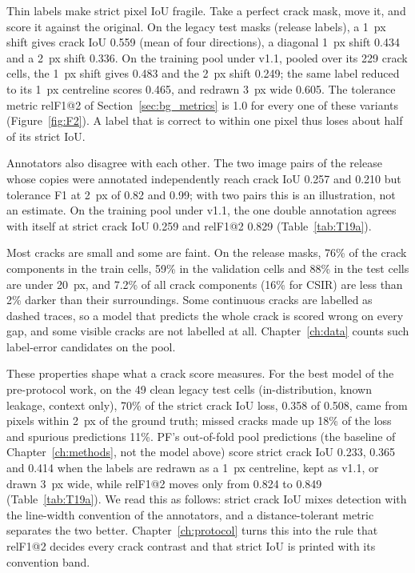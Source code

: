 Thin labels make strict pixel IoU fragile. Take a perfect crack mask, move it, and score it against the original. On the
legacy test masks (release labels), a 1~px shift gives crack IoU 0.559 (mean of four directions), a diagonal 1~px shift
0.434 and a 2~px shift 0.336. On the training pool under v1.1, pooled
over its 229 crack cells, the 1~px shift gives 0.483 and the 2~px shift 0.249; the same label reduced to its 1~px
centreline scores 0.465, and redrawn 3~px wide 0.605. The tolerance metric relF1@2 of Section~\ref{sec:bg_metrics} is 1.0
for every one of these variants (Figure~\ref{fig:F2}). A label that is correct to within one pixel thus loses about half of its
strict IoU.

Annotators also disagree with each other. The two image pairs of the release whose copies were annotated independently
reach crack IoU 0.257 and 0.210 but tolerance F1 at 2~px of 0.82 and 0.99; with two pairs this is an illustration, not an
estimate. On the training pool under v1.1, the one double annotation agrees with itself at strict
crack IoU 0.259 and relF1@2 0.829 (Table~\ref{tab:T19a}).

Most cracks are small and some are faint. On the release masks, 76\% of the crack components in the train cells, 59\% in the
validation cells and 88\% in the test cells are under 20~px, and 7.2\% of all crack components (16\% for CSIR) are less
than 2\% darker than their surroundings. Some continuous cracks are labelled as dashed traces, so a model that predicts
the whole crack is scored wrong on every gap, and some visible cracks are not labelled at all. Chapter~\ref{ch:data}
counts such label-error candidates on the pool.

These properties shape what a crack score measures. For the best model of the pre-protocol work, on the 49 clean legacy test
cells (in-distribution, known leakage, context only), 70\% of the strict crack IoU loss, 0.358 of 0.508, came from pixels
within 2~px of the ground truth; missed cracks made up 18\% of the loss and spurious predictions 11\%. PF's out-of-fold pool
predictions (the baseline of Chapter~\ref{ch:methods}, not the model above) score strict crack IoU 0.233, 0.365 and 0.414 when the labels are redrawn as a 1~px centreline, kept as v1.1, or
drawn 3~px wide, while relF1@2 moves only from 0.824 to 0.849 (Table~\ref{tab:T19a}). We read this as follows: strict crack
IoU mixes detection with the line-width convention of the annotators, and a distance-tolerant metric separates the two
better. Chapter~\ref{ch:protocol} turns this into the rule that relF1@2 decides every crack contrast and that strict IoU is
printed with its convention band.

